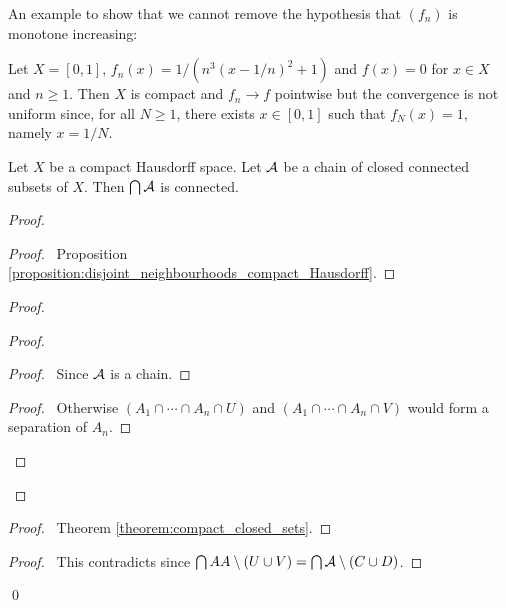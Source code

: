 An example to show that we cannot remove the hypothesis that $(f_n)$ is monotone increasing:

\begin{example}
    Let $X = [0,1]$, $f_n(x) = 1 / (n^3 (x - 1/n)^2 + 1)$ and $f(x) = 0$ for $x \in X$ and $n \geq 1$. Then $X$ is compact and $f_n \rightarrow f$
    pointwise but the convergence is not uniform since, for all $N \geq 1$, there exists $x \in [0,1]$ such that $f_N(x) = 1$, namely
    $x = 1/N$.
\end{example}

\begin{theorem}
    Let $X$ be a compact Hausdorff space. Let $\AA$ be a chain of closed connected subsets of $X$. Then $\bigcap \AA$ is connected.
\end{theorem}

\begin{proof}
    \pf
    \begin{proof}
        \pf\ Proposition \ref{proposition:disjoint_neighbourhoods_compact_Hausdorff}.
    \end{proof}
    \begin{proof}
        \begin{proof}
            \pf
            \begin{proof}
                \pf\ Since $\AA$ is a chain.
            \end{proof}
            \begin{proof}
                \pf\ Otherwise $(A_1 \cap \cdots \cap A_n \cap U)$ and $(A_1 \cap \cdots \cap A_n \cap V)$
                would form a separation of $A_n$.
            \end{proof}
        \end{proof}
    \end{proof}
    \begin{proof}
        \pf\ Theorem \ref{theorem:compact_closed_sets}.
    \end{proof}
    \qedstep
    \begin{proof}
        \pf\ This contradicts  since $\bigcap AA \setminus (U \cup V)
        = \bigcap \AA \setminus (C \cup D)$.
    \end{proof}
    \qed
\end{proof}


